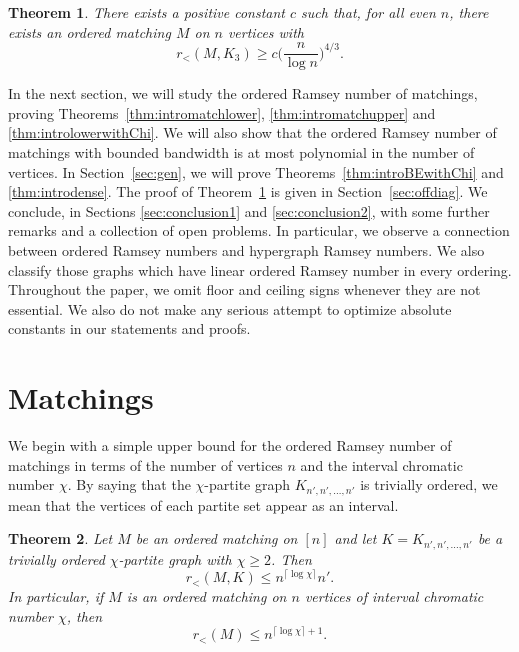 \documentclass[11pt]{article}
\newtheorem{theorem}{Theorem}[section]
\begin{document}
\begin{theorem} \label{thm:offdiag}
There exists a positive constant $c$ such that, for all even $n$, there exists an ordered matching $M$ on $n$ vertices with
\[r_{<}(M, K_3) \ge c\Big(\frac{n}{\log n}\Big)^{4/3}.\]
\end{theorem}

In the next section, we will study the ordered Ramsey number of matchings, proving Theorems~\ref{thm:intromatchlower}, \ref{thm:intromatchupper} and \ref{thm:introlowerwithChi}. We will also show that the ordered Ramsey number of matchings with bounded bandwidth is at most polynomial in the number of vertices. In Section~\ref{sec:gen}, we will prove Theorems~\ref{thm:introBEwithChi} and \ref{thm:introdense}. The proof of Theorem~\ref{thm:offdiag} is given in Section~\ref{sec:offdiag}. We conclude, in Sections \ref{sec:conclusion1} and \ref{sec:conclusion2}, with some further remarks and a collection of open problems. In particular, we observe a connection between ordered Ramsey numbers and hypergraph Ramsey numbers. We also classify those graphs which have linear ordered Ramsey number in every ordering. Throughout the paper, we omit floor and ceiling signs whenever they are not essential. We also do not make any serious attempt to optimize absolute constants in our statements and proofs.

\section{Matchings} \label{sec:matchings}

We begin with a simple upper bound for the ordered Ramsey number of matchings in terms of the number of vertices $n$ and the interval chromatic number $\chi$. By saying that the $\chi$-partite graph $K_{n', n', \dots, n'}$ is trivially ordered, we mean that the vertices of each partite set appear as an interval.

\begin{theorem} \label{thm:matchupper}
Let $M$ be an ordered matching on $[n]$ and let $K = K_{n', n', \dots, n'}$ be a trivially ordered $\chi$-partite graph with $\chi \geq 2$. Then 
\[r_<(M, K) \leq n^{\lceil \log \chi \rceil} n'.\]
In particular, if $M$ is an ordered matching on $n$ vertices of interval chromatic number $\chi$, then
\[r_<(M) \leq n^{\lceil \log \chi \rceil+1}.\]
\end{theorem}
\end{document}
